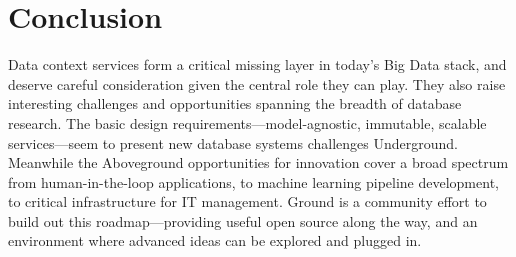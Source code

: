 \documentclass{sig-alternate}
\begin{document}


\section{Conclusion}
\label{sec:conclusion}
Data context services form a critical missing layer in today's Big Data stack, and deserve careful consideration given the central role they can play. 
They also raise interesting challenges and opportunities spanning the breadth of database research. 
The basic design requirements---model-agnostic, immutable, scalable services---seem to present new database systems challenges Underground. Meanwhile the Aboveground opportunities for innovation cover a broad spectrum from human-in-the-loop applications, to machine learning pipeline development, to critical infrastructure for IT management.  Ground is a community effort to build out this roadmap---providing useful open source along the way, and an environment where advanced ideas can be explored and plugged in.


\end{document}
